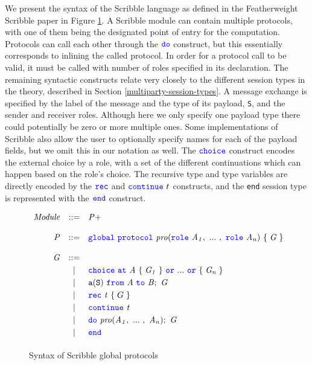 \documentclass[12pt,twoside]{report}
\newcommand{\white}{\ \ \ \ \ \ \ \ \ \ \ \ }
\begin{document}
We present the syntax of the Scribble language as defined in the Featherweight Scribble paper\cite{featherweight} in Figure \ref{scribble-global-protocol}. A Scribble module can contain multiple protocols, with one of them being the designated point of entry for the computation. Protocols can call each other through the ${\color{blue}\mathtt{do}}$ construct, but this essentially corresponds to inlining the called protocol. In order for a protocol call to be valid, it must be called with number of roles specified in its declaration. The remaining syntactic constructs relate very closely to the different session types in the theory, described in Section \ref{multiparty-session-types}. A message exchange is specified by the label of the message and the type of its payload, \texttt{S}, and the sender and receiver roles. Although here we only specify one payload type there could potentially be zero or more multiple ones. Some implementations of Scribble also allow the user to optionally specify names for each of the payload fields, but we omit this in our notation as well. The ${\color{blue}\mathtt{choice}}$ construct encodes the external choice by a role, with a set of the different continuations which can happen based on the role's choice. The recursive type and type variables are directly encoded by the ${\color{blue}\mathtt{rec}}$ and ${\color{blue}\mathtt{continue}}\ t$ constructs, and the \texttt{end} session type is represented with the ${\color{blue}\mathtt{end}}$ construct.\\



\begin{figure}[!h]
    \centering
    \begin{math}
        \begin{array}{rcl}
            \mathit{Module} & ::= & \mathit{P}+\\\\
            \mathit{P} & ::= & {\color{blue}\mathtt{global}}\ {\color{blue}\mathtt{protocol}}\ \mathit{pro}({\color{blue}\mathtt{role}}\ \mathit{A_1},\ ...\ ,\ {\color{blue}\mathtt{role}}\ \mathit{A_n})\ \{\;\mathit{G}\;\} \\\\
            \mathit{G} & ::= &\\[2.75pt]
              &   | & {\color{blue}\mathtt{choice}}\ {\color{blue}\mathtt{at}}\ \mathit{A}\ \{\;\mathit{G_1}\;\}\ {\color{blue}\mathtt{or}}\ ...\ {\color{blue}\mathtt{or}}\ \{\;\mathit{G_n}\;\} \\[2.75pt]
              &   | & \mathtt{a}(\mathtt{S})\ {\color{blue}\mathtt{from}}\ \mathit{A}\ {\color{blue}\mathtt{to}}\ \mathit{B};\ \mathit{G} \\[2.75pt]
              &   | & {\color{blue}\mathtt{rec}}\ \mathit{t}\ \{\;G\;\} \\[2.75pt]
              &   | &  {\color{blue}\mathtt{continue}}\ \mathit{t} \\[2.75pt]
              &   | & {\color{blue}\mathtt{do}}\ \mathit{pro}(\mathit{A_1},\ ...\ ,\ \mathit{A_n});\ \mathit{G} \\[2.75pt]
              &   | & {\color{blue}\mathtt{end}} \\[2.75pt]
        \end{array}
    \end{math}
    \caption{Syntax of Scribble global protocols}
    \label{scribble-global-protocol}
\end{figure}
\end{document}
